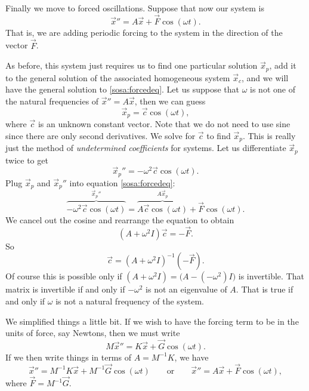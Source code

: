 Finally we move to forced oscillations.
Suppose that now our system is
\begin{equation} \label{sosa:forcedeq}
{\vec{x}}'' = A \vec{x} + \vec{F} \cos ( \omega t) .
\end{equation}
That is, we are adding periodic forcing to the system in the direction of
the vector $\vec{F}$.

As before, this system just requires us to find one particular solution
$\vec{x}_p$, add it to the general solution of the associated homogeneous system
$\vec{x}_c$, and we will have the general solution to \eqref{sosa:forcedeq}.
Let us suppose that $\omega$ is not one of the natural frequencies of
${\vec{x}}'' = A \vec{x}$, then we can guess
\begin{equation*}
\vec{x}_p = \vec{c} \cos (\omega t) ,
\end{equation*}
where $\vec{c}$ is an unknown constant vector.  Note that we do not need
to use sine since there are only second derivatives.  We solve for $\vec{c}$ to
find $\vec{x}_p$.  This is really just the method of
\emph{undetermined coefficients}
for systems.  Let us differentiate $\vec{x}_p$ twice to get
\begin{equation*}
{\vec{x}_p}'' = -\omega^2 \vec{c} \cos (\omega t) .
\end{equation*}
Plug $\vec{x}_p$ and ${\vec{x}_p}''$ into equation \eqref{sosa:forcedeq}:
\begin{equation*}
\overbrace{
-\omega^2 \vec{c} \cos (\omega t)
}^{{\vec{x}_p}''}
=
\overbrace{
A \vec{c} \cos (\omega t) 
}^{A \vec{x}_p}
+ \vec{F} \cos (\omega t) .
\end{equation*}
We cancel out the cosine and rearrange the equation to obtain
\begin{equation*}
(A +\omega^2 I) \vec{c}
=
- \vec{F} .
\end{equation*}
So
\begin{equation*}
\vec{c}
=
{(A +\omega^2 I)}^{-1}
(-\vec{F} ).
\end{equation*}
Of course this is possible only if
$(A+ \omega^2 I) = \bigl(A- (-\omega^2) I\bigr)$ is
invertible.  That matrix is invertible if and only if
$-\omega^2$ is not an eigenvalue of $A$.  That is true if and only if $\omega$
is not a natural frequency of the system.

We simplified things a little bit.  If we wish to have the
forcing term to be in the units of force, say Newtons, then we must write
\begin{equation*}
M \vec{x}'' = K \vec{x} + \vec{G} \cos(\omega t) .
\end{equation*}
If we then write things in terms of $A = M^{-1} K$, we have
\begin{equation*}
\vec{x}'' = M^{-1}K \vec{x} + M^{-1} \vec{G} \cos(\omega t) 
\qquad \text{or} \qquad
\vec{x}'' = A \vec{x} + \vec{F} \cos(\omega t) ,
\end{equation*}
where $\vec{F} = M^{-1} \vec{G}$.

